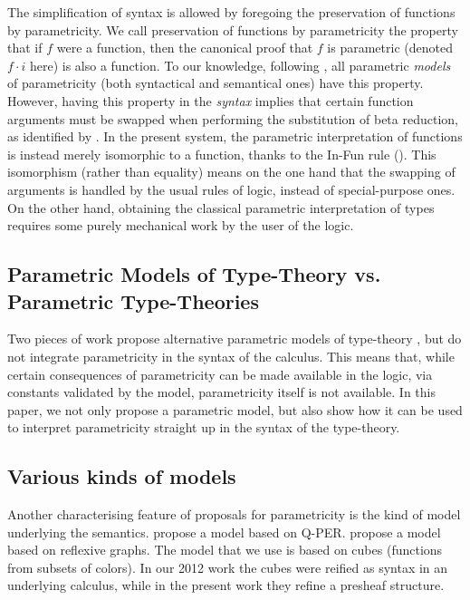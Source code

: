 \documentclass[english]{PaperTools/latex/lipics}
\newcommand\param[1]{\!\cdot\!#1}
\begin{document}
The simplification of syntax is allowed by foregoing the preservation
of functions by parametricity. We call preservation of functions by
parametricity the property that if $f$ were a function, then the
canonical proof that $f$ is parametric (denoted $f \param i$ here) is
also a function. To our knowledge, following \citet{reynolds_types_1983}, all parametric \emph{models} of parametricity (both syntactical and semantical ones) have this property.
However, having this property in the \emph{syntax} implies that
certain function arguments must be swapped when performing the
substitution of beta reduction, as identified by
\citet{bernardy_computational_2012}.  In the present system, the
parametric interpretation of functions is instead merely isomorphic to
a function, thanks to the {\sc In-Fun} rule (). This
isomorphism (rather than equality) means on the one hand that the
swapping of arguments is handled by the usual rules of logic, instead
of special-purpose ones. On the other hand, obtaining the classical
parametric interpretation of types requires some purely mechanical
work by the user of the logic.

\subsection{Parametric Models of Type-Theory vs. Parametric Type-Theories}

Two pieces of work propose alternative parametric models of
type-theory
\citep{atkey_relationally_2014,krishnaswami_internalizing_2013}, but
do not integrate parametricity in the syntax of the calculus. This
means that, while certain consequences of parametricity can be made
available in the logic, via constants validated by the model,
parametricity itself is not available. In this paper, we not only
propose a parametric model, but also show how it can be used to
interpret parametricity straight up in the syntax of the type-theory.


\subsection{Various kinds of models}
Another characterising feature of proposals for parametricity is the
kind of model underlying the
semantics.  propose a model
based on Q-PER.  propose a model based
on reflexive graphs. The model that we use is based on cubes
(functions from subsets of colors). In
our 2012 work the cubes were reified as syntax in
an underlying calculus, while in the present work they refine a presheaf structure.
\end{document}
